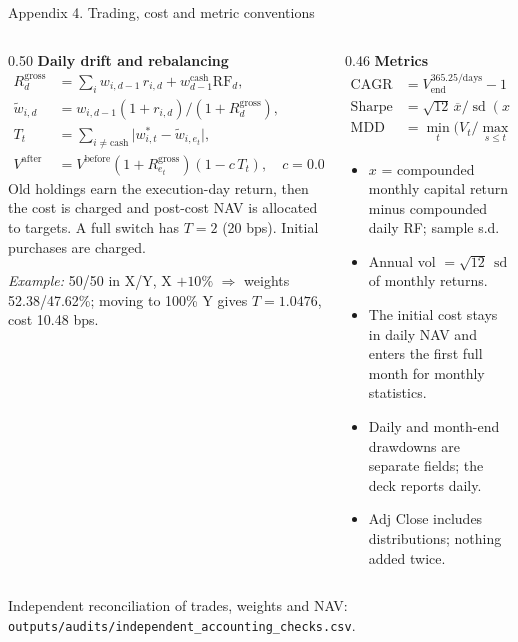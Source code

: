 \documentclass[aspectratio=169,11pt]{beamer}
\newcommand{\src}[1]{\par\vfill{\scriptsize\color{muted}\sloppy #1\par}\vskip0.05cm}
\begin{document}
\begin{frame}[t]{Appendix 4. Trading, cost and metric conventions}
\begin{columns}[T,onlytextwidth]
\begin{column}{0.50\textwidth}
\small\textbf{Daily drift and rebalancing}
\footnotesize
\begin{align*}
R^{\text{gross}}_d &= \textstyle\sum_i w_{i,d-1}\,r_{i,d} + w^{\text{cash}}_{d-1}\mathrm{RF}_d,\\
\tilde w_{i,d} &= w_{i,d-1}(1+r_{i,d})/(1+R^{\text{gross}}_d),\\
T_t &= \textstyle\sum_{i\neq\text{cash}} \big|w^{*}_{i,t}-\tilde w_{i,e_t}\big|,\\
V^{\text{after}} &= V^{\text{before}}(1+R^{\text{gross}}_{e_t})(1-c\,T_t),\quad c=0.001 .
\end{align*}
Old holdings earn the execution-day return, then the cost is charged and post-cost NAV is allocated to targets. A full switch has $T=2$ (20 bps). Initial purchases are charged.

\vskip0.1cm
\textit{Example:} 50/50 in X/Y, X $+10\%$ $\Rightarrow$ weights 52.38/47.62\%; moving to 100\% Y gives $T=1.0476$, cost 10.48 bps.
\end{column}
\begin{column}{0.46\textwidth}
\small\textbf{Metrics}
\footnotesize
\begin{align*}
\text{CAGR} &= V_{\text{end}}^{365.25/\text{days}}-1 \quad(\text{from execution date}),\\
\text{Sharpe} &= \sqrt{12}\,\overline{x}/\operatorname{sd}(x),\\
\text{MDD} &= \min_t\big(V_t/\max_{s\le t}V_s-1\big),\ V_0=1 .
\end{align*}
\begin{itemize}\itemsep2pt
\item $x$ = compounded monthly capital return minus compounded daily RF; sample s.d.
\item Annual vol $=\sqrt{12}\,\operatorname{sd}$ of monthly returns.
\item The initial cost stays in daily NAV and enters the first full month for monthly statistics.
\item Daily and month-end drawdowns are separate fields; the deck reports daily.
\item Adj Close includes distributions; nothing added twice.
\end{itemize}
\end{column}
\end{columns}
\src{Independent reconciliation of trades, weights and NAV: \texttt{outputs/audits/independent\_accounting\_checks.csv}.}
\end{frame}
\end{document}
